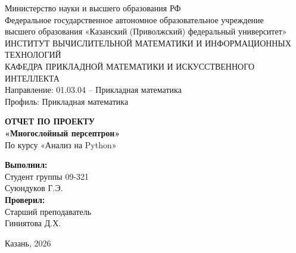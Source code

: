 \documentclass[a4paper,14pt]{extarticle}
\begin{document}
\sloppy

\begin{titlepage}
    \begin{center}
        Министерство науки и высшего образования РФ\\
        \vspace{0.4cm}
        Федеральное государственное автономное образовательное учреждение\\
        высшего образования «Казанский (Приволжский) федеральный университет»\\
        \vspace{0.4cm}
        ИНСТИТУТ ВЫЧИСЛИТЕЛЬНОЙ МАТЕМАТИКИ 
        И ИНФОРМАЦИОННЫХ ТЕХНОЛОГИЙ\\
        КАФЕДРА ПРИКЛАДНОЙ МАТЕМАТИКИ
        И ИСКУССТВЕННОГО ИНТЕЛЛЕКТА\\
        Направление: 01.03.04 – Прикладная математика\\
        Профиль: Прикладная математика

        
        \vspace{3.5cm}
        \textbf{\Large ОТЧЕТ ПО ПРОЕКТУ}\\
        \vspace{0.5cm}
        \textbf{\large «Многослойный персептрон»}\\
        \vspace{0.8cm}
        По курсу «Анализ на Python»
    \end{center}

    \vspace{2.5cm}
    \begin{flushright}
        \textbf{Выполнил:}\\
        Студент группы 09-321\\
        Суюндуков Г.Э.\\
        \vspace{0.8cm}
        \textbf{Проверил:}\\
        Старший преподаватель\\
        Гиниятова Д.Х.\\
    \end{flushright}

    \vfill
    \begin{center}
        Казань, 2026
    \end{center}
\end{titlepage}

\clearpage
{}
\setcounter{page}{2}
\tableofcontents
\clearpage
\end{document}
